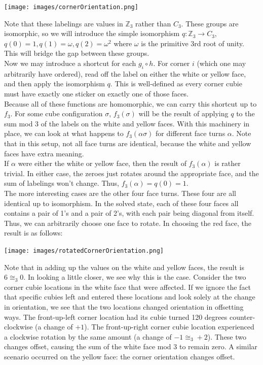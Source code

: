 \documentclass[10pt,letterpaper]{report}
\begin{document}
\begin{center}
\texttt{[image: images/cornerOrientation.png]} 
\end{center}

Note that these labelings are values in $\mathbb{Z}_3$ rather than $C_3$.  These groups are isomorphic, so we will introduce the simple isomorphism $q: \mathbb{Z}_3 \rightarrow C_3$, $q(0) = 1, q(1) = \omega, q(2) = \omega^2$ where $\omega$ is the primitive 3rd root of unity.  This will bridge the gap between these groups. \\

Now we may introduce a shortcut for each $g_i \circ h$.  For corner $i$ (which one may arbitrarily have ordered), read off the label on either the white or yellow face, and then apply the isomorphism $q$.  This is well-defined as every corner cubie must have exactly one sticker on exactly one of those faces. \\

Because all of these functions are homomorphic, we can carry this shortcut up to $f_3$.  For some cube configuration $\sigma$, $f_3(\sigma)$ will be the result of applying $q$ to the sum mod 3 of the labels on the white and yellow faces.  With this machinery in place, we can look at what happens to $f_3(\alpha \sigma)$ for different face turns $\alpha$.  Note that in this setup, not all face turns are identical, because the white and yellow faces have extra meaning. \\

If $\alpha$ were either the white or yellow face, then the result of $f_3(\alpha)$ is rather trivial.  In either case, the zeroes just rotates around the appropriate face, and the sum of labelings won't change.  Thus, $f_3(\alpha) = q(0) = 1$. \\

The more interesting cases are the other four face turns.  These four are all identical up to isomorphism.  In the solved state, each of these four faces all contains a pair of 1's and a pair of 2's, with each pair being diagonal from itself.  Thus, we can arbitrarily choose one face to rotate.  In choosing the red face, the result is as follows:

\begin{center}
\texttt{[image: images/rotatedCornerOrientation.png]} 
\end{center}

Note that in adding up the values on the white and yellow faces, the result is $6 \cong_3 0$.  In looking a little closer, we see why this is the case.  Consider the two corner cubie locations in the white face that were affected.  If we ignore the fact that specific cubies left and entered these locations and look solely at the change in orientation, we see that the two locations changed orientation in offsetting ways.  The front-up-left corner location had its cubie turned 120 degrees counter-clockwise (a change of $+1$).  The front-up-right corner cubie location experienced a clockwise rotation by the same amount (a change of $-1 \cong_3 +2$).  These two changes offset, causing the sum of the white face mod 3 to remain zero.  A similar scenario occurred on the yellow face: the corner orientation changes offset. \\
\end{document}

